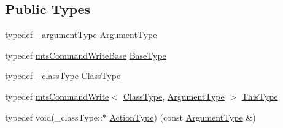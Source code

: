 \subsection*{Public Types}
\begin{DoxyCompactItemize}
\item 
typedef \+\_\+argument\+Type \hyperlink{classmts_command_write_aa8ff942dbc4caedb34d83a5d6bf47c10}{Argument\+Type}
\item 
typedef \hyperlink{classmts_command_write_base}{mts\+Command\+Write\+Base} \hyperlink{classmts_command_write_a40dcfd022c15b4411c0eb5d8fc670dcd}{Base\+Type}
\item 
typedef \+\_\+class\+Type \hyperlink{classmts_command_write_aeccc8c434133c4adae34916b42ad493c}{Class\+Type}
\item 
typedef \hyperlink{classmts_command_write}{mts\+Command\+Write}$<$ \hyperlink{classmts_command_write_aeccc8c434133c4adae34916b42ad493c}{Class\+Type}, \hyperlink{classmts_command_write_aa8ff942dbc4caedb34d83a5d6bf47c10}{Argument\+Type} $>$ \hyperlink{classmts_command_write_a629a4131789c13f5bca121ccc8370ae3}{This\+Type}
\item 
typedef void(\+\_\+class\+Type\+::$\ast$ \hyperlink{classmts_command_write_adb59c0a9491a687d96877bb27516b0e7}{Action\+Type}) (const \hyperlink{classmts_command_write_aa8ff942dbc4caedb34d83a5d6bf47c10}{Argument\+Type} \&)
\end{DoxyCompactItemize}
